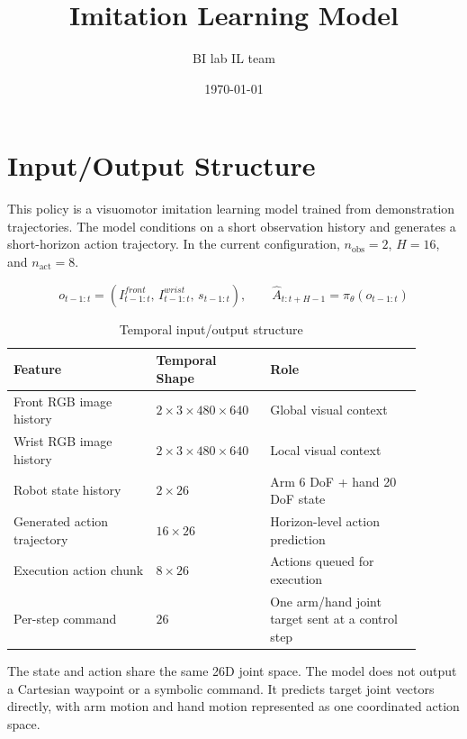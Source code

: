\documentclass[9pt,a4paper]{article}
\title{\vspace{-2.0em}Imitation Learning Model}
\author{BI lab IL team}
\date{\vspace{-0.8em}\today}
\begin{document}
\maketitle
\vspace{-2.0em}

\section{Input/Output Structure}

This policy is a visuomotor imitation learning model trained from demonstration
trajectories. The model conditions on a short observation history and generates a
short-horizon action trajectory. In the current configuration,
$n_{\mathrm{obs}}=2$, $H=16$, and $n_{\mathrm{act}}=8$.

\[
o_{t-1:t}
=
\left(
I_{t-1:t}^{front},\,
I_{t-1:t}^{wrist},\,
s_{t-1:t}
\right),
\qquad
\hat{A}_{t:t+H-1} = \pi_\theta(o_{t-1:t})
\]

\begin{table}[h]
\centering
\small
\begin{tabular}{p{0.32\linewidth} p{0.24\linewidth} p{0.34\linewidth}}
\toprule
\textbf{Feature} & \textbf{Temporal Shape} & \textbf{Role} \\
\midrule
Front RGB image history & $2 \times 3 \times 480 \times 640$ & Global visual context \\
Wrist RGB image history & $2 \times 3 \times 480 \times 640$ & Local visual context \\
Robot state history & $2 \times 26$ & Arm 6 DoF + hand 20 DoF state \\
Generated action trajectory & $16 \times 26$ & Horizon-level action prediction \\
Execution action chunk & $8 \times 26$ & Actions queued for execution \\
Per-step command & $26$ & One arm/hand joint target sent at a control step \\
\bottomrule
\end{tabular}
\caption{Temporal input/output structure}
\end{table}

The state and action share the same 26D joint space. The model does not output a
Cartesian waypoint or a symbolic command. It predicts target joint vectors directly,
with arm motion and hand motion represented as one coordinated action space.
\end{document}
